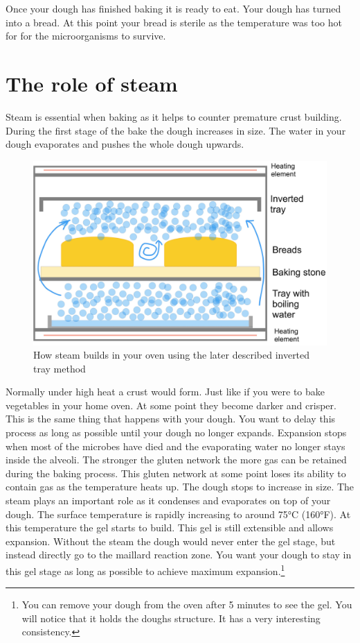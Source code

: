 Once your dough has finished baking it is ready to eat. Your
dough has turned into a bread. At this
point your bread is sterile as the temperature was too hot for
for the microorganisms to survive.

\section{The role of steam}

Steam is essential when baking as it helps to counter premature
crust building. During the first stage of the bake the dough
increases in size. The water in your dough evaporates and pushes
the whole dough upwards. 

\begin{figure}[!htb]
  \includegraphics[width=\textwidth]{baking-process-steam.jpg}
  \caption{How steam builds in your oven using the later described
  inverted tray method}
\end{figure}

Normally under high heat a crust would form. Just like
if you were to bake vegetables in your home oven. At some point
they become darker and crisper. This is the same thing that
happens with your dough. You want to delay this process
as long as possible until your dough no longer expands.
Expansion stops when most of the microbes have died and
the evaporating water no longer stays inside the alveoli.
The stronger the gluten network the more gas can be retained
during the baking process. This gluten network at some point
loses its ability to contain gas as the temperature heats
up. The dough stops to increase in size. The steam plays
an important role as it condenses and evaporates on top
of your dough. The surface temperature is rapidly increasing
to around 75°C (160°F). At this temperature the gel starts
to build. This gel is still extensible and allows expansion.
Without the steam the dough would never enter the gel stage,
but instead directly go to the maillard reaction zone. You
want your dough to stay in this gel stage as long as possible
to achieve maximum expansion.\footnote{You can remove your
dough from the oven after 5 minutes to see the gel. You will notice
that it holds the doughs structure. It has a very interesting consistency.}

